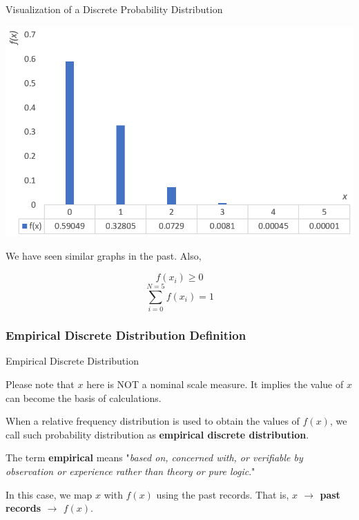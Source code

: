 \documentclass{beamer}
\begin{document}
\begin{frame}{Visualization of a Discrete Probability Distribution}

\begin{center}
\includegraphics[scale=0.3]{images/section4DevelopingDiscreteProbDist.png}
\end{center}

\begin{center}
We have seen similar graphs in the past. Also, 

$$f(x_i) \geq 0$$
$$\sum_{i=0}^{N=5} f(x_i) = 1 $$


\end{center}
\end{frame}


\subsubsection{Empirical Discrete Distribution Definition}
\begin{frame}{Empirical Discrete Distribution}


Please note that $x$ here is NOT a nominal scale measure. It implies the value of $x$ can become the basis of calculations.

\vspace{0.3 cm}
When a relative frequency distribution is used to obtain the values of $f(x)$, we call such probability distribution as \textbf{empirical discrete distribution}.

\vspace{0.3 cm}

The term \textbf{empirical} means "\textit{based on, concerned with, or verifiable by observation or experience rather than theory or pure logic}."


\vspace{0.3 cm}
In this case, we map $x$ with $f(x)$ using the past records. That is, \textbf{$x$ $\rightarrow$ past records $\rightarrow$ $f(x)$}. 


\end{frame}
\end{document}
